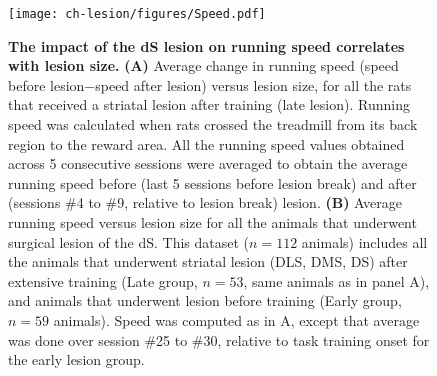 \begin{figure}[bth!]
  \begin{center}
    \texttt{[image: ch-lesion/figures/Speed.pdf]}
    \caption[]
    {\textbf{The impact of the dS lesion on running speed correlates with lesion size.}
    \textbf{(A)} Average change in running speed (speed before lesion$-$speed after lesion) versus lesion size, for all the rats that received a striatal lesion after training (late lesion).
    Running speed was calculated when rats crossed the treadmill from its back region to the reward area.
    All the running speed values obtained across 5 consecutive sessions were averaged to obtain the average running speed before (last 5 sessions before lesion break) and after (sessions \#4 to \#9, relative to lesion break) lesion. 
    \textbf{(B)} Average running speed versus lesion size for all the animals that underwent surgical lesion of the dS.
    This dataset ($n=112$ animals) includes all the animals that underwent striatal lesion (DLS, DMS, DS) after extensive training (Late group, $n=53$, same animals as in panel A), and animals that underwent lesion before training (Early group, $n=59$ animals).
    Speed was computed as in A, except that average was done over session \#25 to \#30, relative to task training onset for the early lesion group.
    }
    \label{fig:lesion:spd}
  \end{center}
\end{figure}
